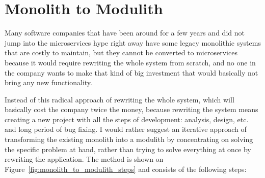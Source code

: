 
\section{Monolith to Modulith}
\label{subsection:monolith_to_modulith}
Many software companies that have been around for a few years and did not jump into the microservices hype right away have some legacy monolithic systems that are costly to maintain, but they cannot be converted to microservices because it would require rewriting the whole system from scratch, and no one in the company wants to make that kind of big investment that would basically not bring any new functionality.

Instead of this radical approach of rewriting the whole system, which will basically cost the company twice the money, because rewriting the system means creating a new project with all the steps of development: analysis, design, etc. and long period of bug fixing. I would rather suggest an iterative approach of transforming the existing monolith into a modulith by concentrating on solving the specific problem at hand, rather than trying to solve everything at once by rewriting the application. The method is shown on Figure~\ref{fig:monolith_to_modulith_steps} and consists of the following steps:


